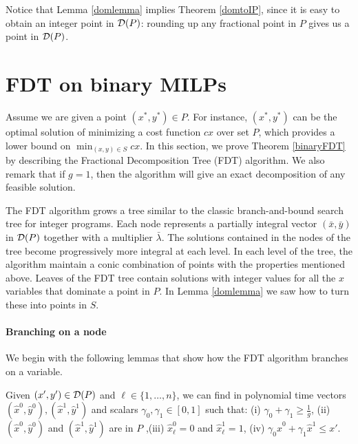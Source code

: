 	Notice that Lemma \ref{domlemma} implies Theorem \ref{domtoIP}, since it is easy to obtain an integer point in $\operatorname{\mathcal{D}}(P)$: rounding up any fractional point in $P$ gives us a point in $\operatorname{\mathcal{D}}(P)$.




\section{FDT on binary MILPs}
\label{binaryfdt}

Assume we are given a point $(x^*,y^*)\in P$. For instance, $(x^*,y^*)$ can be the optimal solution of minimizing a cost function $cx$ over set $P$, which provides a lower bound on $\min_{(x,y)\in S} cx$.  In this section, we prove Theorem \ref{binaryFDT} by describing the Fractional Decomposition Tree (FDT) algorithm. We also remark that if $g=1$, then the algorithm will give an exact decomposition of any feasible solution. 


The FDT algorithm grows a tree similar to the classic branch-and-bound search tree for integer programs. Each node represents a partially integral vector $(\bar{x},\bar{y})$ in $\operatorname{\mathcal{D}}(P)$ together with a multiplier $\bar{\lambda}$. The solutions contained in the nodes of the tree become progressively more integral at each level. In each level of the tree, the algorithm maintain a conic combination of points with the properties mentioned above. Leaves of the FDT tree contain solutions with integer values for all the $x$ variables that dominate a point in $P$. In Lemma  \ref{domlemma} we saw how to turn these into points in $S$. 

\paragraph{Branching on a node}
We begin with the following lemmas that show how the FDT algorithm branches on a variable.
\begin{lemma}\label{LPClemma}
	Given $(x',y')\in \operatorname{\mathcal{D}}(P)$ and $\ell\in \{1,\ldots,n\}$, we can find in polynomial time vectors $(\hat{x}^0,\hat{y}^0),(\hat{x}^1,\hat{y}^1)$ and scalars $\gamma_0,\gamma_1 \in [0,1]$ such that: (i) $\gamma_0 + \gamma_1  \geq \frac{ 1}{g}$, (ii) $(\hat{x}^0,\hat{y}^0)$ and $(\hat{x}^1,\hat{y}^1)$ are in  $ P$
		,(iii) $\hat{x}^0_\ell=0$ and $\hat{x}^1_\ell=1$, (iv) $\gamma_0 \hat{x}^0 + \gamma_1\hat{x}^1 \leq x'$.
\end{lemma}


